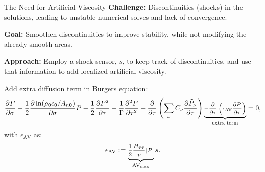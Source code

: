 \documentclass{beamer}
\newcounter{sectionframecount}
\begin{document}
\begin{frame}[t]{The Need for Artificial Viscosity}
\vspace{-10pt}
\textbf{Challenge:} Discontinuities (shocks) in the solutions, leading to unstable
numerical solves and lack of convergence.

\vspace{5pt}
\textbf{Goal:} Smoothen discontinuities to improve stability, while not modifying
the already smooth areas.

\vspace{5pt}
\textbf{Approach:} Employ a shock sensor, $s$, to keep track of discontinuities, and use that information to add localized artificial viscosity.

\vspace{10pt}
Add extra diffusion term in Burgers equation:
\vspace{-2pt}
\begin{equation}
  \footnotesize
  \dfrac{\partial P}{\partial \sigma}
  -\dfrac{1}{2}\dfrac{\partial \ln(\rho_0c_0/A_{n0})}{\partial \sigma}P
  -\dfrac{1}{2}\dfrac{\partial P^2}{\partial \tau}
  -\dfrac{1}{\Gamma}\dfrac{\partial ^2 P}{\partial \tau^2}
  -\dfrac{\partial }{\partial \tau}\left(\sum_{\nu} C_\nu \dfrac{\partial\tilde{P}_\nu}{\partial \tau}\right)
  \underbrace{- \dfrac{\partial}{\partial \tau} \left(\epsilon_{\text{AV}}\dfrac{\partial P}{\partial \tau}\right)}_{\text{extra term}}
  =0,
\end{equation}
with $\epsilon_{\text{AV}}$ as:
\vspace{-2pt}
\begin{equation}
  \footnotesize
  \epsilon_{\text{AV}} := \underbrace{\dfrac{1}{2}\dfrac{H_{\tau\tau}}{p}|P|}_{\text{AV}_{\text{max}}}s.
\end{equation}

\end{frame}

\end{document}
